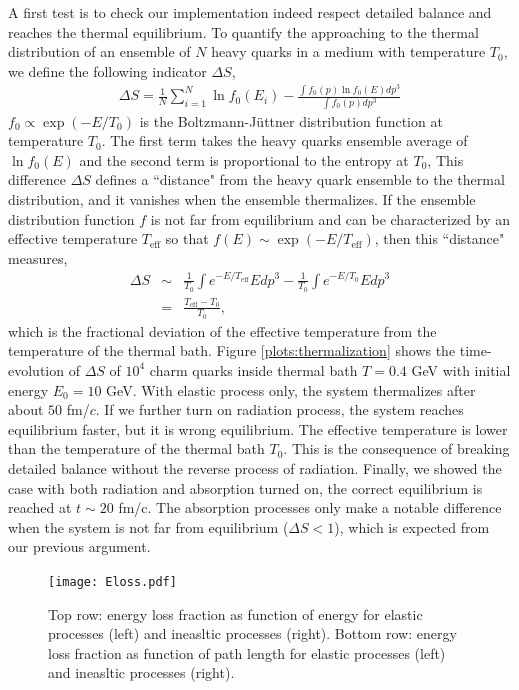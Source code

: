 \documentclass[aps, prc, reprint, amsmath, groupedaddress, nofootinbib]{revtex4-1}
\begin{document}
A first test is to check our implementation indeed respect detailed balance and reaches the thermal equilibrium.
To quantify the approaching to the thermal distribution of an ensemble of $N$ heavy quarks in a medium with temperature $T_0$, we define the following indicator $\Delta S$,
\begin{eqnarray}
\Delta S = \frac{1}{N}\sum_{i=1}^{N} \ln f_0(E_i) - \frac{\int f_0(p)\ln f_0(E) dp^3}{\int f_0(p) dp^3}
\end{eqnarray}
$f_0 \propto \exp(-E/T_0)$ is the Boltzmann-J\"uttner distribution function at temperature $T_0$. 
The first term takes the heavy quarks ensemble average of $\ln f_0(E)$ and the second term is proportional to the entropy at $T_0$,
This difference $\Delta S$ defines a ``distance" from the heavy quark ensemble to the thermal distribution, and it vanishes when the ensemble thermalizes.
If the ensemble distribution function $f$ is not far from equilibrium and can be characterized by an effective temperature $T_{\textrm{eff}}$ so that $f(E)\sim \exp(-E/T_{\textrm{eff}})$, then this ``distance" measures,
\begin{eqnarray}
\nonumber
\Delta S &\sim& \frac{1}{T_0}\int  e^{-E/T_{\textrm{eff}}} E dp^3 - \frac{1}{T_0}\int e^{-E/T_0} E dp^3 \\
&=& \frac{T_\textrm{eff}-T_0}{T_0},
\end{eqnarray}
which is the fractional deviation of the effective temperature from the temperature of the thermal bath.
Figure \ref{plots:thermalization} shows the time-evolution of $\Delta S$ of $10^4$ charm quarks inside thermal bath $T=0.4$ GeV with initial energy $E_0 = 10$ GeV.
With elastic process only, the system thermalizes after about $50$ fm/$c$.
If we further turn on radiation process, the system reaches equilibrium faster, but it is wrong equilibrium.
The effective temperature is lower than the temperature of the thermal bath $T_0$.
This is the consequence of breaking detailed balance without the reverse process of radiation.
Finally, we showed the case with both radiation and absorption turned on, the correct equilibrium is reached at $t\sim 20$ fm/c.
The absorption processes only make a notable difference when the system is not far from equilibrium ($\Delta S < 1$), which is expected from our previous argument.
\begin{figure}
\texttt{[image: Eloss.pdf]}
\caption{Top row: energy loss fraction as function of energy for elastic processes (left) and ineasltic processes (right). Bottom row: energy loss fraction as function of path length for elastic processes (left) and ineasltic processes (right).}\label{plots:dEE}
\end{figure}
\end{document}
